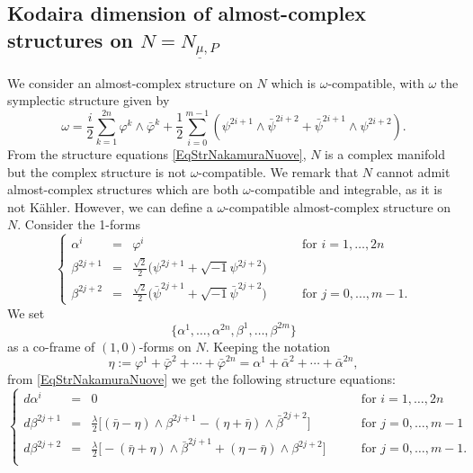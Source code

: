 \documentclass[a4paper, 11pt]{amsart}
\theoremstyle{plain}
\theoremstyle{definition}
\numberwithin{equation}{section}
\begin{document}
\subsection{Kodaira dimension of almost-complex structures on $N = N_{\underline{\mu}, P}$}
We consider an almost-complex structure on $N$ which is $\omega$-compatible, with $\omega$ the symplectic structure given by
\[\omega = \dfrac{i}{2} \sum_{k = 1}^{2n}\varphi^{k} \wedge \bar\varphi^{k} + \dfrac{1}{2}\sum_{i = 0}^{m-1}\left(\psi^{2i+1} \wedge \bar\psi^{2i+2} + \bar\psi^{2i+1} \wedge \psi^{2i+2} \right).\]
From the structure equations \eqref{EqStrNakamuraNuove}, $N$ is a complex manifold  but the complex structure is not $\omega$-compatible. We remark that $N$ cannot admit almost-complex structures which are both $\omega$-compatible and integrable, as it is not K\"ahler. However, we can define a  $\omega$-compatible almost-complex structure on $N$. Consider the 1-forms
\begin{equation}\label{ACmplxStrOnNewManifolds}
\left\{
\begin{array}{llll}
\alpha^{i} &=& \varphi^{i} \qquad & \text{for } i = 1,\ldots, 2n\\ [3pt] \beta^{2j+1} &=& \frac{\sqrt{2}}{2}\bigl(\psi^{2j+1} + \sqrt{-1}\psi^{2j+2}\bigr) {} &\\[3pt]
\beta^{2j+2} &=& \frac{\sqrt{2}}{2}\bigl(\bar\psi^{2j+1} + \sqrt{-1}\bar\psi^{2j+2}\bigr) \qquad &\text{for } j = 0, ..., m-1.
\end{array}    
\right.
\end{equation}
We set $$\{\alpha^{1}, \ldots, \alpha^{2n}, \beta^{1}, \ldots, \beta^{2m}\}
$$
as a co-frame of $(1,0)$-forms on $N$. Keeping the notation $$\eta := \varphi^{1} + \bar\varphi^{2} + \cdots + \bar \varphi^{2n} = \alpha^{1} + \bar\alpha^{2} + \cdots + \bar \alpha^{2n},$$ from \eqref{EqStrNakamuraNuove} we get the following structure equations:
$$
\left\{
\begin{array}{llll}
    d\alpha^{i} &=& 0 \qquad &\text{for } i = 1, \ldots, 2n \\[3pt]
    d\beta^{2j+1} &=& \frac{\lambda}{2}\bigl[(\bar\eta - \eta) \wedge \beta^{2j+1} - (\eta + \bar\eta) \wedge \bar\beta^{2j+2}\bigr] \qquad & \text{for } j = 0, \ldots, m-1 \\[3pt] 
    d\beta^{2j+2} &=& \frac{\lambda}{2}\bigl[-(\bar\eta + \eta) \wedge \bar\beta^{2j+1} + (\eta - \bar\eta) \wedge \beta^{2j+2}\bigr] \qquad & \text{for } j = 0, \ldots, m-1.\\[3pt]
\end{array}
\right.
$$
\end{document}
